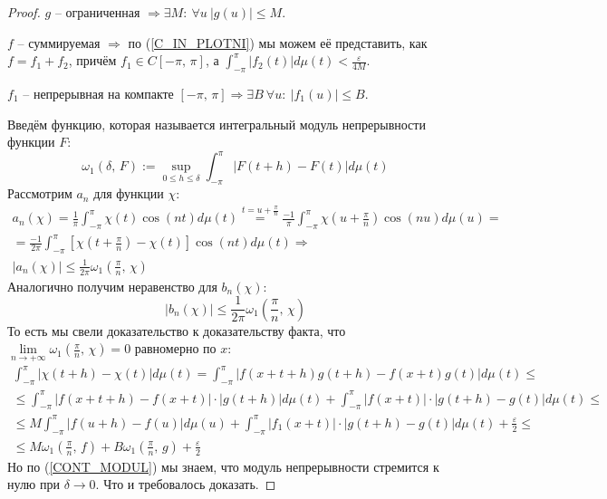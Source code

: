 \documentclass[a4paper,12pt]{article}
\renewcommand{\leq}{\ensuremath{\leqslant}}
\theoremstyle{plain}
\theoremstyle{definition}
\theoremstyle{remark}
\begin{document}
\begin{proof}
	$g$ -- ограниченная $\Rightarrow \exists M:\: \forall u \: |g(u)| \leq M$.

	$f$ -- суммируемая $\Rightarrow$ по (\ref{C_IN_PLOTNI}) мы можем её представить, как $f = f_1 + f_2$, причём $f_1 \in C[-\pi,\,\pi]$, а $\int_{-\pi}^{\pi} |f_2(t)|d\mu(t) < \frac{\varepsilon}{4M}$.

	$f_1$ -- непрерывная на компакте $[-\pi,\,\pi] \Rightarrow \exists B \: \forall u:\: |f_1(u)| \leq B$.

	Введём функцию, которая называется интегральный модуль непрерывности функции $F$:
	\[\omega_1(\delta,\,F) := \sup_{0 \leq h \leq \delta} \int_{-\pi}^\pi |F(t + h) - F(t)|d\mu(t)\]
	Рассмотрим $a_n$ для функции $\chi$:
	\begin{align*}
		a_n(\chi) = \frac{1}{\pi} \int_{-\pi}^\pi \chi(t)\cos(nt)d\mu(t) \stackrel{t = u + \frac{\pi}{n}}{=} \frac{-1}{\pi}\int_{-\pi}^\pi \chi\left(u + \frac{\pi}{n}\right)\cos(nu)d\mu(u) = \\
		= \frac{-1}{2\pi}\int_{-\pi}^\pi \left[\chi\left(t + \frac{\pi}{n}\right) - \chi(t)\right]\cos(nt)d\mu(t) \Rightarrow                                                                  \\
		|a_n(\chi)| \leq \frac{1}{2\pi}\omega_1\left(\frac{\pi}{n},\, \chi\right)
	\end{align*}
	Аналогично получим неравенство для $b_n(\chi)$:
	\[|b_n(\chi)| \leq \frac{1}{2\pi}\omega_1\left(\frac{\pi}{n},\,\chi\right)\]
	То есть мы свели доказательство к доказательству факта, что $\lim\limits_{n \to +\infty}\omega_1(\frac{\pi}{n},\,\chi) = 0$ равномерно по $x$:
	\begin{align*}
		\int_{-\pi}^\pi |\chi(t + h) - \chi(t)|d\mu(t) = \int_{-\pi}^\pi |f(x + t + h)g(t + h) - f(x + t)g(t)|d\mu(t) \leq                        \\
		\leq \int_{-\pi}^\pi |f(x + t + h) - f(x + t)|\cdot |g (t + h)|d\mu(t) + \int_{-\pi}^\pi |f(x + t)|\cdot |g(t + h) - g(t)|d\mu(t) \leq    \\
		\leq M \int_{-\pi}^\pi |f(u + h) - f(u)|d\mu(u) +  \int_{-\pi}^\pi |f_1(x + t)|\cdot|g(t + h) - g(t)|d\mu(t) + \frac{\varepsilon}{2} \leq \\
		\leq M \omega_1(\frac{\pi}{n},\, f) + B\omega_1(\frac{\pi}{n},\,g) + \frac{\varepsilon}{2}
	\end{align*}
	Но по (\ref{CONT_MODUL}) мы знаем, что модуль непрерывности стремится к нулю при $\delta \to 0$. Что и требовалось доказать.
\end{proof}
\end{document}
